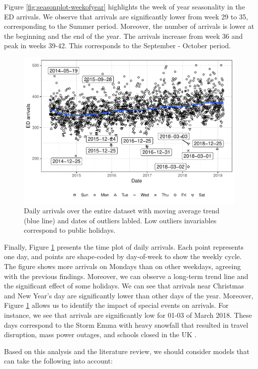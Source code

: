 \documentclass[]{elsarticle} %
\begin{document}
Figure \ref{fig:seasonplot-weekofyear} highlights the week of year
seasonality in the ED arrivals. We observe that arrivals are
significantly lower from week 29 to 35, corresponding to the Summer
period. Moreover, the number of arrivals is lower at the beginning and
the end of the year. The arrivals increase from week 36 and peak in
weeks 39-42. This corresponds to the September - October period.

\begin{figure}[H]

{\centering \includegraphics[width=0.7\linewidth]{paper_files/figure-latex/date-plot-1} 

}

\caption{Daily arrivals over the entire dataset with moving average trend (blue line) and dates of outliers labled. Low outliers invariables correspond to public holidays.}\label{fig:date-plot}
\end{figure}

Finally, Figure \ref{fig:date-plot} presents the time plot of daily
arrivals. Each point represents one day, and points are shape-coded by
day-of-week to show the weekly cycle. The figure shows more arrivals on
Mondays than on other weekdays, agreeing with the previous findings.
Moreover, we can observe a long-term trend line and the significant
effect of some holidays. We can see that arrivals near Christmas and New
Year's day are significantly lower than other days of the year.
Moreover, Figure \ref{fig:date-plot} allows us to identify the impact
of special events on arrivals. For instance, we see that arrivals are
significantly low for 01-03 of March 2018. These days correspond to the
Storm Emma with heavy snowfall that resulted in travel disruption, mass
power outages, and schools closed in the UK \citep{stormemma2018}.

Based on this analysis and the literature review, we should consider
models that can take the following into account:
\end{document}

